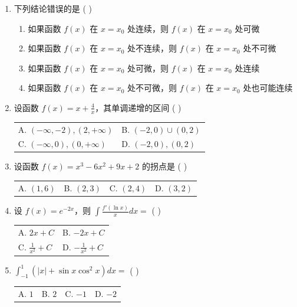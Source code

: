 \documentclass[10pt, a3paper, landscape, twocolumn]{article}
\begin{document}
\begin{enumerate}
    \item 下列结论错误的是 ( \quad ) \\
    \begin{enumerate}[label=\Alph{enumii}., leftmargin=2em]
        \item 如果函数 $f(x)$ 在 $x=x_0$ 处连续，则 $f(x)$ 在 $x=x_0$ 处可微
        \item 如果函数 $f(x)$ 在 $x=x_0$ 处不连续，则 $f(x)$ 在 $x=x_0$ 处不可微
        \item 如果函数 $f(x)$ 在 $x=x_0$ 处可微，则 $f(x)$ 在 $x=x_0$ 处连续
        \item 如果函数 $f(x)$ 在 $x=x_0$ 处不可微，则 $f(x)$ 在 $x=x_0$ 处也可能连续
    \end{enumerate}

    \item 设函数 $f(x) = x + \frac{4}{x}$，其单调递增的区间 ( \quad ) \\
    \begin{tabularx}{\linewidth}{@{} *{2}{X} @{}}
        A. $(-\infty,-2),(2,+\infty)$ & B. $(-2,0) \cup (0,2)$ \\
        C. $(-\infty,0),(0,+\infty)$  & D. $(-2,0),(0,2)$
    \end{tabularx}

    \item 设函数 $f(x) = x^3 - 6x^2 + 9x + 2$ 的拐点是 ( \quad ) \\
    \begin{tabularx}{\linewidth}{@{} *{4}{X} @{}}
        A. $(1,6)$ & B. $(2,3)$ & C. $(2,4)$ & D. $(3,2)$
    \end{tabularx}

    \item 设 $f(x) = e^{-2x}$，则 $\int \frac{f'(\ln x)}{x} dx =$ ( \quad ) \\
    \begin{tabularx}{\linewidth}{@{} *{2}{X} @{}}
        A. $2x + C$ & B. $-2x + C$ \\
        C. $\frac{1}{x^2} + C$ & D. $-\frac{1}{x^2} + C$
    \end{tabularx}

    \item $\int_{-1}^{1} (|x| + \sin x \cos^2 x) dx =$ ( \quad ) \\
    \begin{tabularx}{\linewidth}{@{} *{4}{X} @{}}
        A. $1$ & B. $2$ & C. $-1$ & D. $-2$
    \end{tabularx}


\end{enumerate}
\end{document}
